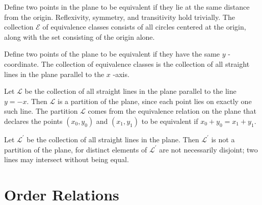 \begin{centeredblock}
 \begin{example}
\label{ex:\thesection.\theexample}
 Define two points in the plane to be equivalent if they lie at the same distance from the origin. Reflexivity, symmetry, and transitivity hold trivially. The collection \(\mathcal{E}\) of equivalence classes consists of all circles centered at the origin, along with the set consisting of the origin alone.
 \end{example}
\end{centeredblock}

\begin{centeredblock}
 \begin{example}
\label{ex:\thesection.\theexample}
 Define two points of the plane to be equivalent if they have the same \(y\) -coordinate. The collection of equivalence classes is the collection of all straight lines in the plane parallel to the \(x\) -axis.
 \end{example}
\end{centeredblock}

\begin{centeredblock}
 \begin{example}
\label{ex:\thesection.\theexample}
 Let \(\mathcal{L}\) be the collection of all straight lines in the plane parallel to the line \(y = - x\). Then \(\mathcal{L}\) is a partition of the plane, since each point lies on exactly one such line. The partition \(\mathcal{L}\) comes from the equivalence relation on the plane that declares the points \(({x_{0},y_{0}})\) and \(({x_{1},y_{1}})\) to be equivalent if \(x_{0} + y_{0} = x_{1} + y_{1}\).
 \end{example}
\end{centeredblock}

\begin{centeredblock}
 \begin{example}
\label{ex:\thesection.\theexample}
 Let \(\mathcal{L}^{\prime }\) be the collection of all straight lines in the plane. Then \(\mathcal{L}^{\prime }\) is not a partition of the plane, for distinct elements of \(\mathcal{L}^{\prime }\) are not necessarily disjoint; two lines may intersect without being equal.
 \end{example}
\end{centeredblock}

\section*{Order Relations}

